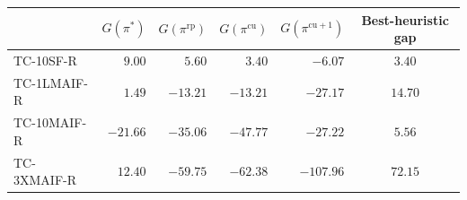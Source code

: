 %   
\small
\renewcommand{\arraystretch}{1.3}
\setlength{\tabcolsep}{7pt}
\begin{tabularx}{\textwidth}{Xrrrrc}
  \toprule
  \rowcolor{headbg}
  \multicolumn{1}{c}{\color{headfg}\textbf{Config}} &
  \multicolumn{1}{c}{\color{headfg}$G(\pi^{*})$} &
  \multicolumn{1}{c}{\color{headfg}$G(\pi^{\mathrm{rp}})$} &
  \multicolumn{1}{c}{\color{headfg}$G(\pi^{\mathrm{cu}})$} &
  \multicolumn{1}{c}{\color{headfg}$G(\pi^{\mathrm{cu}+1})$} &
  \multicolumn{1}{c}{\color{headfg}\textbf{Best-heuristic gap}} \\
  \midrule
  TC-10SF-R   & $9.00$   & $5.60$   & $3.40$   & $-6.07$   & $3.40$  \\
  TC-1LMAIF-R & $1.49$   & $-13.21$ & $-13.21$ & $-27.17$  & $14.70$ \\
  TC-10MAIF-R & $-21.66$ & $-35.06$ & $-47.77$ & $-27.22$  & $5.56$  \\
  TC-3XMAIF-R & $12.40$  & $-59.75$ & $-62.38$ & $-107.96$ & $72.15$ \\
  \bottomrule
\end{tabularx}